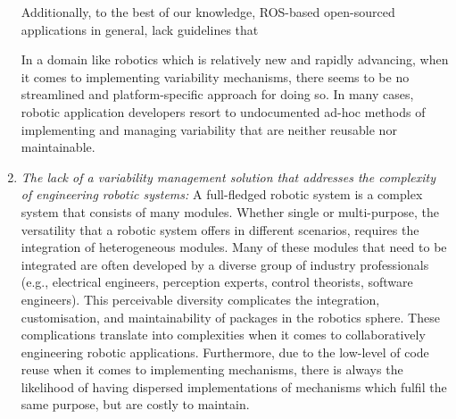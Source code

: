 \documentclass[conference]{IEEEtran}
\begin{document}
\begin{enumerate}
    Additionally, to the best of our knowledge, ROS-based open-sourced applications in general, lack guidelines that
    
    In a domain like robotics which is relatively new and rapidly advancing, when it comes to implementing variability mechanisms, there seems to be no streamlined and platform-specific approach for doing so. In many cases, robotic application developers resort to undocumented ad-hoc methods of implementing and managing variability that are neither reusable nor maintainable.
    
    \item \textit{The lack of a variability management solution that addresses the complexity of engineering robotic systems: }A full-fledged robotic system is a complex system that consists of many modules. Whether single or multi-purpose, the versatility that a robotic system offers in different scenarios, requires the integration of heterogeneous modules. Many of these modules that need to be integrated are often developed by a diverse group of industry professionals (e.g., electrical engineers, perception experts, control theorists, software engineers). This perceivable diversity complicates the integration, customisation, and maintainability of packages in the robotics sphere. These complications translate into complexities when it comes to collaboratively engineering robotic applications. Furthermore, due to the low-level of code reuse when it comes to implementing mechanisms, there is always the likelihood of having dispersed implementations of mechanisms which fulfil the same purpose, but are costly to maintain.
\end{enumerate}
\end{document}
